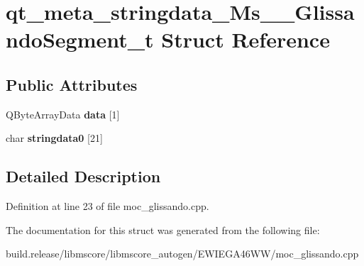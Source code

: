 \hypertarget{structqt__meta__stringdata___ms_____glissando_segment__t}{}\section{qt\+\_\+meta\+\_\+stringdata\+\_\+\+Ms\+\_\+\+\_\+\+Glissando\+Segment\+\_\+t Struct Reference}
\label{structqt__meta__stringdata___ms_____glissando_segment__t}
\subsection*{Public Attributes}
\begin{DoxyCompactItemize}
\item 
\mbox{\label{structqt__meta__stringdata___ms_____glissando_segment__t_a74556b52ecf4934dd7a93f77b2666cdb}} 
Q\+Byte\+Array\+Data {\bfseries data} \mbox{[}1\mbox{]}
\item 
\mbox{\label{structqt__meta__stringdata___ms_____glissando_segment__t_a07e3bea44f67075c2e8fa239dc40747b}} 
char {\bfseries stringdata0} \mbox{[}21\mbox{]}
\end{DoxyCompactItemize}


\subsection{Detailed Description}


Definition at line 23 of file moc\+\_\+glissando.\+cpp.



The documentation for this struct was generated from the following file\+:\begin{DoxyCompactItemize}
\item 
build.\+release/libmscore/libmscore\+\_\+autogen/\+E\+W\+I\+E\+G\+A46\+W\+W/moc\+\_\+glissando.\+cpp\end{DoxyCompactItemize}
